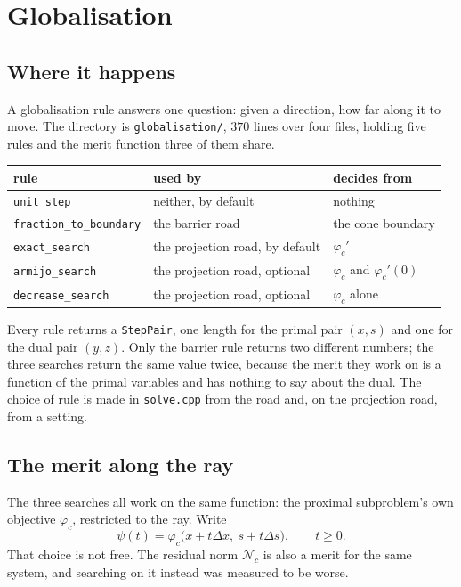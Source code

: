 \documentclass[a4paper,11pt]{book}
\theoremstyle{plain}
\theoremstyle{definition}
\theoremstyle{remark}
\numberwithin{equation}{chapter}
\numberwithin{algorithm}{chapter}
\begin{document}
	\chapter{Globalisation}

	\section{Where it happens}

	A globalisation rule answers one question: given a direction, how far along it
	to move. The directory is \texttt{globalisation/}, $370$ lines over four
	files, holding five rules and the merit function three of them share.

	\begin{table}[H]
		\centering\small
		\begin{tabular}{lll}
			\toprule
			rule & used by & decides from\\
			\midrule
			\texttt{unit\_step} & neither, by default & nothing\\
			\texttt{fraction\_to\_boundary} & the barrier road & the cone boundary\\
			\texttt{exact\_search} & the projection road, by default &
			$\varphi_c'$\\
			\texttt{armijo\_search} & the projection road, optional &
			$\varphi_c$ and $\varphi_c'(0)$\\
			\texttt{decrease\_search} & the projection road, optional &
			$\varphi_c$ alone\\
			\bottomrule
		\end{tabular}
	\end{table}

	Every rule returns a \texttt{StepPair}, one length for the primal pair
	$(x,s)$ and one for the dual pair $(y,z)$. Only the barrier rule returns two
	different numbers; the three searches return the same value twice, because
	the merit they work on is a function of the primal variables and has nothing
	to say about the dual. The choice of rule is made in \texttt{solve.cpp} from
	the road and, on the projection road, from a setting.

	\section{The merit along the ray}

	The three searches all work on the same function: the proximal subproblem's
	own objective $\varphi_c$, restricted to the ray. Write
	\begin{equation}
		\psi(t)=\varphi_c\bigl(x+t\Delta x,\ s+t\Delta s\bigr),
		\qquad t\geq0 .
	\end{equation}
	That choice is not free. The residual norm $\mathcal{N}_c$ is also a merit for
	the same system, and searching on it instead was measured to be worse.
\end{document}
